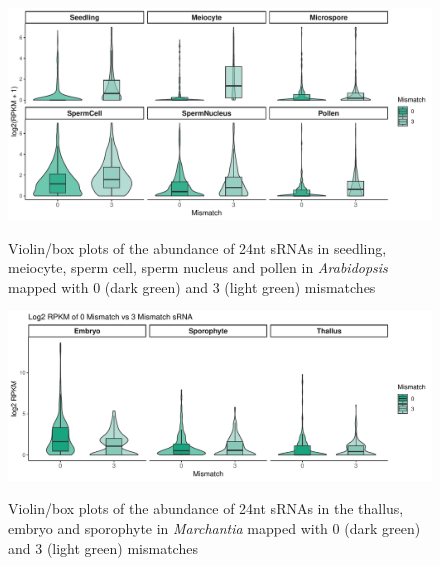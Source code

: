 \begin{figure}[htbp!] 
\centering    
    \includegraphics[width=1\textwidth]{Chapter3/Figs/Supps/0vs3_mismatch_Arabidopsis.pdf}
\caption{Violin/box plots of the abundance of 24nt sRNAs in seedling, meiocyte, sperm cell, sperm nucleus and pollen in \textit{Arabidopsis} mapped with 0 (dark green) and 3 (light green) mismatches}
\label{fig:At_0v3}
\captionsetup{font=small}
    \caption*{}
\end{figure}

\begin{figure}[htbp!] 
\centering    
    \includegraphics[width=1\textwidth]{Chapter3/Figs/Supps/0v3_mismatch_Marchantia.pdf}
\caption{Violin/box plots of the abundance of 24nt sRNAs in the thallus, embryo and sporophyte in \textit{Marchantia} mapped with 0 (dark green) and 3 (light green) mismatches}
\label{fig:Mp_0v3}
\captionsetup{font=small}
    \caption*{}
\end{figure}

